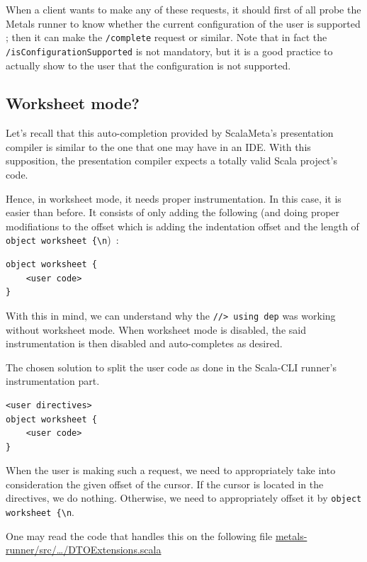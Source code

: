 \documentclass{article}
\begin{document}
When a client wants to make any of these requests, it should first of all probe the Metals runner to know whether the current configuration of the user is supported ; then it can make the \lstinline{/complete} request or similar. Note that in fact the \lstinline{/isConfigurationSupported} is not mandatory, but it is a good practice to actually show to the user that the configuration is not supported.

\subsection{Worksheet mode?}

Let's recall that this auto-completion provided by ScalaMeta's presentation compiler is similar to the one that one may have in an IDE. With this supposition, the presentation compiler expects a totally valid Scala project's code.

Hence, in worksheet mode, it needs proper instrumentation. In this case, it is easier than before. It consists of only adding the following (and doing proper modifiations to the offset which is adding the indentation offset and the length of \lstinline|object worksheet {\n|)~:

\begin{lstlisting}
object worksheet {
    <user code>
}
\end{lstlisting}

With this in mind, we can understand why the \lstinline{//> using dep} was working without worksheet mode. When worksheet mode is disabled, the said instrumentation is then disabled and auto-completes as desired.

The chosen solution to split the user code as done in the Scala-CLI runner's instrumentation part.

\begin{lstlisting}
<user directives>
object worksheet {
    <user code>
}
\end{lstlisting}

When the user is making such a request, we need to appropriately take into consideration the given offset of the cursor. If the cursor is located in the directives, we do nothing. Otherwise, we need to appropriately offset it by \lstinline|object worksheet {\n|.

One may read the code that handles this on the following file \href{https://github.com/Maeeen/scastie/blob/main/metals-runner/src/main/scala/scastie/metals/DTOExtensions.scala}{metals-runner/src/\ldots/DTOExtensions.scala}
\end{document}

